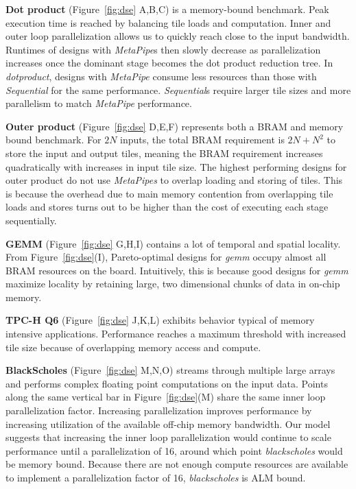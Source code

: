 \textbf{Dot product} (Figure~\ref{fig:dse} A,B,C) is a memory-bound benchmark. Peak execution
time is reached by balancing tile loads and computation. Inner and outer loop parallelization allows us to
quickly reach close to the input bandwidth. Runtimes of designs with \emph{MetaPipe}s then slowly decrease as parallelization
increases once the dominant stage becomes the dot product reduction tree. In \emph{dotproduct}, designs with \emph{MetaPipe} consume less resources than those with \emph{Sequential} for the same performance. \emph{Sequential}s require larger tile sizes and more parallelism to match \emph{MetaPipe} performance.

\textbf{Outer product} (Figure~\ref{fig:dse} D,E,F) represents both a BRAM and memory bound benchmark. For $2N$ inputs,
the total BRAM requirement is $2N + N^2$ to store the input and output tiles, meaning the BRAM requirement
increases quadratically with increases in input tile size. The highest performing designs for outer product do not use
\emph{MetaPipes} to overlap loading and storing of tiles. This is because the overhead due to main memory contention from overlapping
tile loads and stores turns out to be higher than the cost of executing each stage sequentially.

\textbf{GEMM} (Figure~\ref{fig:dse} G,H,I) contains a lot of temporal and spatial locality. From Figure~\ref{fig:dse}(I), Pareto-optimal designs for \emph{gemm}
occupy almost all BRAM resources on the board. Intuitively, this is  because good designs for \emph{gemm}
maximize locality by retaining large, two dimensional chunks of data in on-chip memory.

\textbf{TPC-H Q6} (Figure~\ref{fig:dse} J,K,L) exhibits behavior typical of memory intensive applications. Performance reaches a maximum threshold
with increased tile size because of overlapping memory access and compute.

\textbf{BlackScholes} (Figure~\ref{fig:dse} M,N,O) streams through multiple large arrays and performs complex floating point computations
on the input data. Points along the same vertical bar in Figure~\ref{fig:dse}(M) share the same inner loop parallelization
factor. Increasing parallelization improves performance by increasing utilization of the available off-chip memory bandwidth.
Our model suggests that increasing the inner loop parallelization would continue to scale
performance until a parallelization of 16, around which point \emph{blackscholes} would be memory bound. Because there are not enough compute resources are available to implement a parallelization factor of 16, \emph{blackscholes} is ALM bound.

